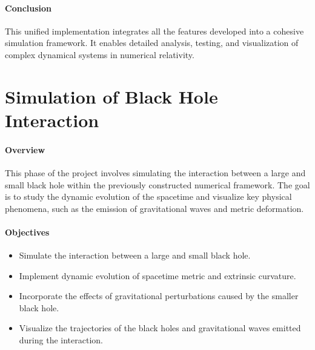 \documentclass[12pt]{article}
\begin{document}
\paragraph{Conclusion}
This unified implementation integrates all the features developed into a cohesive simulation framework. It enables detailed analysis, testing, and visualization of complex dynamical systems in numerical relativity.

\section{Simulation of Black Hole Interaction}

\paragraph{Overview}
This phase of the project involves simulating the interaction between a large and small black hole within the previously constructed numerical framework. The goal is to study the dynamic evolution of the spacetime and visualize key physical phenomena, such as the emission of gravitational waves and metric deformation.

\paragraph{Objectives}
\begin{itemize}
    \item Simulate the interaction between a large and small black hole.
    \item Implement dynamic evolution of spacetime metric and extrinsic curvature.
    \item Incorporate the effects of gravitational perturbations caused by the smaller black hole.
    \item Visualize the trajectories of the black holes and gravitational waves emitted during the interaction.
\end{itemize}
\end{document}
